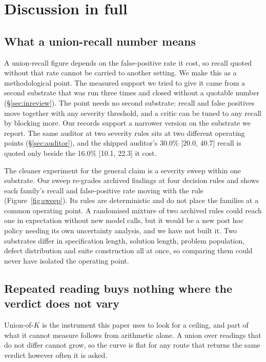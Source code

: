 \section{Discussion in full}
\label{sec:discussion-full}
\subsection{What a union-recall number means}

A union-recall figure depends on the false-positive rate it cost, so recall quoted without that
rate cannot be carried to another setting. We make this as a methodological point. The measured
support we tried to give it came from a second substrate that was run three times and closed
without a quotable number (\S\ref{sec:inreview}). The point needs no second substrate:
recall and false positives move together with any severity threshold, and a critic can be tuned
to any recall by blocking more. Our records support a narrower version on the substrate we
report. The same auditor at two severity rules sits at two different operating points
(\S\ref{sec:auditor}), and the shipped auditor's 30.0\% [20.0, 40.7] recall is quoted only beside
the 16.0\% [10.1, 22.3] it cost.

The cleaner experiment for the general claim is a severity sweep within one substrate. Our sweep
re-grades archived findings at four decision rules and shows each family's recall and
false-positive rate moving with the rule (Figure~\ref{fig:sweep}). Its rules are deterministic
and do not place the families at a common operating point. A randomised mixture of two archived
rules could reach one in expectation without new model calls, but it would be a new post hoc
policy needing its own uncertainty analysis, and we have not built it. Two substrates differ in
specification length, solution length, problem population, defect distribution and suite
construction all at once, so comparing them could never have isolated the operating point.

\subsection{Repeated reading buys nothing where the verdict does not vary}

Union-of-$K$ is the instrument this paper uses to look for a ceiling, and part of what it cannot
measure follows from arithmetic alone. A union over readings that do not differ cannot grow, so
the curve is flat for any route that returns the same verdict however often it is asked.

